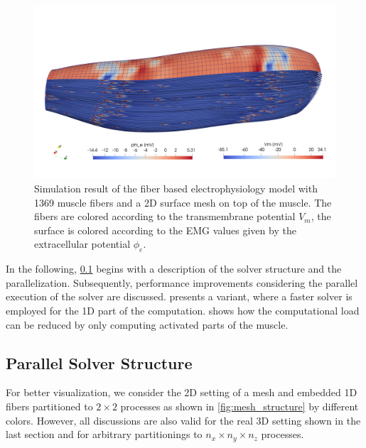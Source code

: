 \begin{figure}
  \centering%
  \includegraphics[width=\textwidth]{images/results/application/fibers_3.png}
  \caption{Simulation result of the fiber based electrophysiology model with 1369 muscle fibers and a 2D surface mesh on top of the muscle. The fibers are colored according to the transmembrane potential $V_m$, the surface is colored according to the EMG values given by the extracellular potential $\phi_e$.}%
  \label{fig:solver_fibers_3}%
\end{figure}

In the following, \cref{sec:parallel_partitioning_for_fiber_based_solver} begins with a description of the solver structure and the parallelization. Subsequently, performance improvements considering the parallel execution of the solver are discussed.  presents a variant, where a faster solver is employed for the 1D part of the computation.  shows how the computational load can be reduced by only computing activated parts of the muscle.

\subsection{Parallel Solver Structure}\label{sec:parallel_partitioning_for_fiber_based_solver}
For better visualization, we consider the 2D setting of a mesh and embedded 1D fibers partitioned to $2\times 2$ processes as shown in \cref{fig:mesh_structure} by different colors. However, all discussions are also valid for the real 3D setting shown in the last section and for arbitrary partitionings to $n_x \times n_y \times n_z$ processes.


